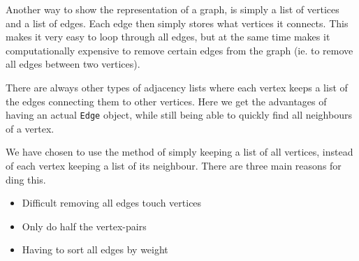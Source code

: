 Another way to show the representation of a graph, is simply a list of vertices and a list of edges. 
Each edge then simply stores what vertices it connects. 
This makes it very easy to loop through all edges, but at the same time makes it computationally expensive to remove certain edges from the graph (ie. 
to remove all edges between two vertices).

There are always other types of adjacency lists where each vertex keeps a list of the edges connecting them to other vertices. Here we get the advantages of having an actual \lstinline|Edge| object, while still being able to quickly find all neighbours of a vertex.

We have chosen to use the method of simply keeping a list of all vertices, instead of each vertex keeping a list of its neighbour. There are three main reasons for ding this.
\begin{itemize}
	\item Difficult removing all edges touch vertices
	\item Only do half the vertex-pairs
	\item Having to sort all edges by weight
\end{itemize}